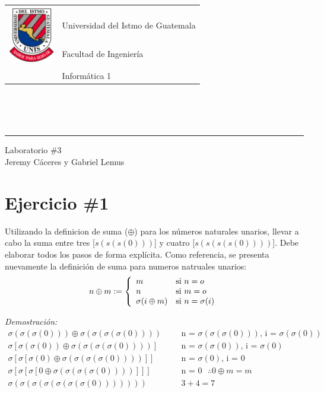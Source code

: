 \documentclass[11pt,letterpaper]{article}
\begin{document}
\begin{tabular}{l l}
\multirow{3}{*}{\includegraphics[width=2cm]{../../recursos/logo}} 
 & \\
 & \LARGE Universidad del Istmo de Guatemala \\
 & \LARGE Facultad de Ingeniería \\
 & \LARGE Informática 1 \\
\end{tabular}
\\\\\\

\begin{center}
	\hrule
	\vspace{0.5cm}
	\huge{Laboratorio \#3} \\
	\vspace{0.1cm}
    \Large{Jeremy Cáceres y Gabriel Lemus}\\
    \vspace{0.05cm}
    \hrulefill
\end{center}
\vspace{0.05cm}

\section*{Ejercicio \#1}
\noindent Utilizando la definicion de suma ($\oplus$) para los números naturales unarios, llevar
a cabo la suma entre tres [$s(s(s(0)))$] y cuatro [$s(s(s(s(0))))$]. Debe elaborar todos
los pasos de forma explícita. Como referencia, se presenta nuevamente la definición de
suma para numeros natruales unarios:
\[
	n\oplus m := \left\{
    \begin{array}{l l}
    	m & \mbox{si } n=o \\
    	n & \mbox{si } m=o \\
    	\sigma(i\oplus m) & \mbox{si } n=\sigma(i) \\
    \end{array}
    \right.
\]

\noindent \emph{Demostración:}
\begin{align}
\sigma(\sigma(\sigma(0))) \oplus \sigma(\sigma(\sigma(\sigma(0))))& && \text{n\ =\ $\sigma(\sigma(\sigma(0)))$, \ i\ =\ $\sigma(\sigma(0))$} \\
\sigma[\sigma(\sigma(0)) \oplus \sigma(\sigma(\sigma(\sigma(0))))]& && \text{n\ =\ $\sigma(\sigma(0))$, \ i\ =\ $\sigma(0)$} \\
\sigma[\sigma[\sigma(0) \oplus \sigma(\sigma(\sigma(\sigma(0))))]]& && \text{n\ =\ $\sigma(0)$, \ i\ =\ $0$} \\
\sigma[\sigma[\sigma[0 \oplus \sigma(\sigma(\sigma(\sigma(0))))]]]& && \text{n\ =\ $0$ \ \ \ $\therefore 0 \oplus m=m$} \\
\sigma(\sigma(\sigma(\sigma(\sigma(\sigma(\sigma(0)))))))& && \text{$3+4=7$}
\end{align}
\end{document}
